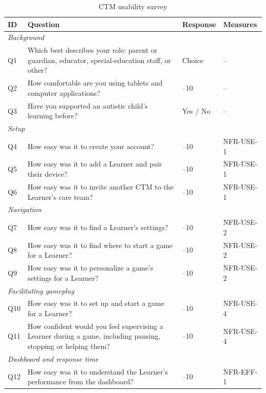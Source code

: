 \documentclass[12pt, titlepage]{article}
\newcommand{\srsref}[1]{#1}
\begin{document}
\begin{table}[htbp]
\centering\small
\caption{CTM usability survey}
\label{tab:ctm-survey}
\renewcommand{\arraystretch}{1.2}
\begin{tabularx}{\textwidth}{l >{\raggedright\arraybackslash}X >{\raggedright\arraybackslash}p{} >{\raggedright\arraybackslash}p{}}
\toprule
\textbf{ID} & \textbf{Question} & \textbf{Response} & \textbf{Measures}\\
\midrule
\multicolumn{4}{l}{\emph{Background}}\\
Q1 & Which best describes your role: parent or guardian, educator, special-education staff, or other? & Choice & --\\
Q2 & How comfortable are you using tablets and computer applications? & 1--10 & --\\
Q3 & Have you supported an autistic child's learning before? & Yes / No & --\\
\midrule
\multicolumn{4}{l}{\emph{Setup}}\\
Q4 & How easy was it to create your account? & 1--10 & \srsref{NFR-USE-1}\\
Q5 & How easy was it to add a Learner and pair their device? & 1--10 & \srsref{NFR-USE-1}\\
Q6 & How easy was it to invite another CTM to the Learner's care team? & 1--10 & \srsref{NFR-USE-1}\\
\midrule
\multicolumn{4}{l}{\emph{Navigation}}\\
Q7 & How easy was it to find a Learner's settings? & 1--10 & \srsref{NFR-USE-2}\\
Q8 & How easy was it to find where to start a game for a Learner? & 1--10 & \srsref{NFR-USE-2}\\
Q9 & How easy was it to personalize a game's settings for a Learner? & 1--10 & \srsref{NFR-USE-2}\\
\midrule
\multicolumn{4}{l}{\emph{Facilitating gameplay}}\\
Q10 & How easy was it to set up and start a game for a Learner? & 1--10 & \srsref{NFR-USE-4}\\
Q11 & How confident would you feel supervising a Learner during a game, including pausing, stopping or helping them? & 1--10 & \srsref{NFR-USE-4}\\
\midrule
\multicolumn{4}{l}{\emph{Dashboard and response time}}\\
Q12 & How easy was it to understand the Learner's performance from the dashboard? & 1--10 & \srsref{NFR-EFF-1}\\

\end{tabularx}
\end{table}
\end{document}
